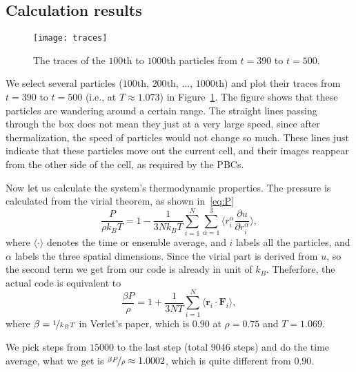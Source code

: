 \subsection{Calculation results}

\begin{figure}[H]
    \centering
    \texttt{[image: traces]}
    \caption{The traces of the \(100\)th to \(1000\)th particles from \(t = 390\) to \(t = 500\).}
    \label{fig:traces}
\end{figure}

We select several particles (\(100\)th, \(200\)th, \(\ldots\), \(1000\)th) and plot their traces
from \(t = 390\) to \(t = 500\) (i.e., at \(T \approx 1.073\)) in Figure~\ref{fig:traces}.
The figure shows that these particles are wandering around a certain
range. The straight lines passing through the box does not mean they just at a very
large speed, since after thermalization, the speed of particles would not change so
much. These lines just indicate that these particles move out the current cell,
and their images reappear from the other side of the cell, as required by the PBCs.

Now let us calculate the  system's thermodynamic properties.
The pressure is calculated from the virial theorem, as shown in~\eqref{eq:P}
%
\begin{equation}\label{eq:P}
    \frac{ P }{ \rho k_B T } = 1 - \frac{ 1 }{ 3N k_B T } \sum_{i=1}^{N}
    \sum_{\alpha=1}^{3}
    \biggl \langle r_i^\alpha \frac{ \partial u }{ \partial r_i^\alpha } \biggr \rangle,
\end{equation}
%
where \(\langle \cdot \rangle\) denotes the time or ensemble average,
and \(i\) labels all the particles, and \(\alpha\) labels the three spatial dimensions.
Since the virial part is derived from \(u\), so the second term we get from our code
is already in unit of \(k_B\). Theferfore, the actual code is
equivalent to
%
\begin{equation}\label{eq:P}
    \frac{ \beta P }{ \rho } = 1 + \frac{ 1 }{ 3N T } \sum_{i=1}^{N}
    \langle \bm{r}_i \cdot \bm{F}_i \rangle,
\end{equation}
%
where \(\beta = \nicefrac{ 1 }{ k_B T }\) in Verlet's paper\cite{Verlet},
which is \(0.90\) at \(\rho = 0.75\) and \(T = 1.069\).

We pick steps from \(15000\) to the last step (total \(9046\) steps) and do the time average,
what we get is \(\nicefrac{ \beta P }{ \rho } \approx 1.0002\), which is quite
different from \(0.90\).

